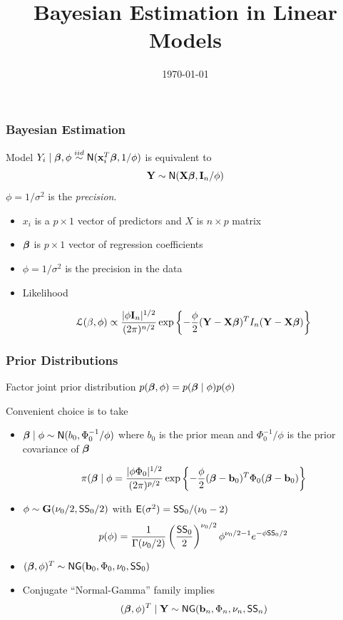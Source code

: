 \documentclass[]{beamer}
\title{Bayesian Estimation in Linear Models}
\institute{Merlise Clyde}
\date{\today}
\begin{document}
\maketitle

\begin{frame}
  \frametitle{Bayesian Estimation}
  
  Model  $Y_i \mid \boldsymbol{\beta}, \phi  \overset{iid}{\sim} \textsf{N}(\mathbf{x}_i^T\boldsymbol{\beta}, 1/\phi)$
   \pause
is equivalent to
$$
\mathbf{Y} \sim \textsf{N}(\mathbf{X} \boldsymbol{\beta}, \mathbf{I}_n/\phi)
$$
\pause
 $\phi = 1/\sigma^2$ is the {\it precision}.
\pause

\vspace{14pt}

\pause
\begin{itemize}
\item  $x_i$ is a $p \times 1$ vector of predictors and $X$ is $n \times p$ matrix
\pause
\item $\boldsymbol{\beta}$ is $p \times 1$ vector of regression coefficients \pause
\item $\phi = 1/\sigma^2$ is the precision in the data


\item  Likelihood

$${\cal L}(\beta, \phi) \propto \frac{|\phi \mathbf{I}_n|^{1/2}}{(2 \pi)^{n/2}}\exp\left\{- \frac{\phi}{2}(\mathbf{Y} - \mathbf{X}\boldsymbol{\beta} )^T I_n (\mathbf{Y} - \mathbf{X}\boldsymbol{\beta})  \right\}$$
\end{itemize}
\end{frame}

\begin{frame}
  \frametitle{Prior Distributions}
Factor joint prior distribution  $p(\boldsymbol{\beta}, \phi) = p(\boldsymbol{\beta} \mid \phi) p(\phi)$
\pause

Convenient choice is to take \pause
\begin{itemize}
\item $\boldsymbol{\beta} \mid \phi \sim \textsf{N}(b_0, \Phi_0^{-1}/\phi)$ where $b_0$ is the prior
  mean and $\Phi_0^{-1}/\phi$ is the prior covariance of $\boldsymbol{\beta}$ 
  
 $$\pi(\boldsymbol{\beta} \mid  \phi = \frac{|\phi \Phi_0|^{1/2}}{(2 \pi)^{p/2}}\exp\left\{- \frac{\phi}{2}(\boldsymbol{\beta} - \mathbf{b}_0)^T \Phi_0 (\boldsymbol{\beta} - \mathbf{b}_0)  \right\}$$ 
  \pause
\item $\phi \sim \mathbf{G}( \nu_0/2, \textsf{SS}_0/2)$  with $\textsf{E}(\sigma^2) =
  \textsf{SS}_0/(\nu_0 - 2)$ \pause
$$p(\phi) = \frac{1}{\Gamma{(\nu_0/2)}}
\left(\frac{\textsf{SS}_0}{2} \right)^{\nu_0/2}
\phi^{\nu_0/2 - 1}
 e^{- \phi \textsf{SS}_0/2}
 $$\pause
\item $(\boldsymbol{\beta}, \phi)^T \sim \textsf{NG}(\mathbf{b}_0, \Phi_0, \nu_0, \textsf{SS}_0)$ \pause
\item Conjugate  ``Normal-Gamma'' family implies \pause
$$(\boldsymbol{\beta}, \phi)^T \mid \mathbf{Y} \sim \textsf{NG}(\mathbf{b}_n, \Phi_n, \nu_n, \textsf{SS}_n)$$
\end{itemize}
\end{frame}
\end{document}
